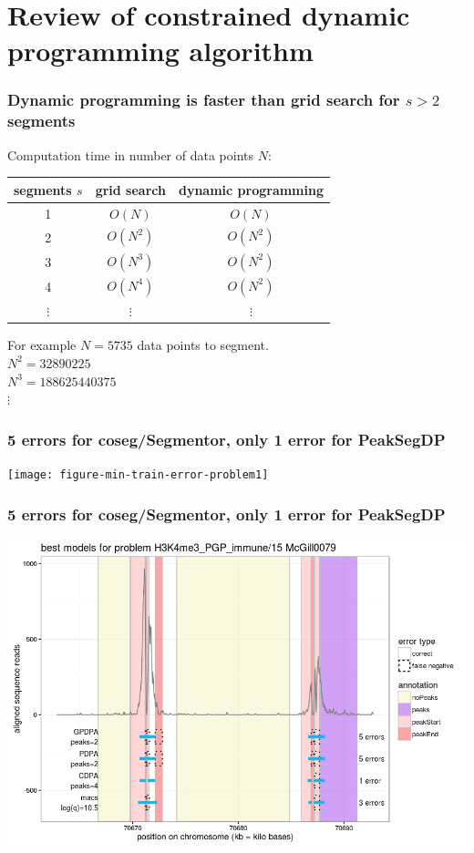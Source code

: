 \documentclass{beamer}
\begin{document}
\section*{Review of constrained dynamic programming algorithm}







\begin{frame}
  \frametitle{Dynamic programming is faster than grid search for $s>
    2$ segments}

  Computation time in number of data points $N$:

  \vskip 1cm

  \begin{tabular}{ccc}
    segments $s$ & grid search & dynamic programming \\
    \hline
    1 & $O(N)$ & $O(N)$ \\
    2 & $O(N^2)$ & $O(N^2)$ \\
    3 & $O(N^3)$ & $O(N^2)$ \\
    4 & $O(N^4)$ & $O(N^2)$ \\
    $\vdots$ &     $\vdots$ &     $\vdots$ 
  \end{tabular}

  \vskip 1cm

  For example $N = 5735$ data points to segment.\\
  $N^2 = 32890225$\\
  $N^3 = 188625440375$\\
  $\vdots$
\end{frame}



\begin{frame}
  \frametitle{5 errors for coseg/Segmentor, only 1 error for PeakSegDP}
  \texttt{[image: figure-min-train-error-problem1]}
\end{frame}

\begin{frame}
  \frametitle{5 errors for coseg/Segmentor, only 1 error for PeakSegDP}
  \includegraphics[width=\textwidth]{figure-min-train-error-problem1-best.png}
\end{frame}
\end{document}
